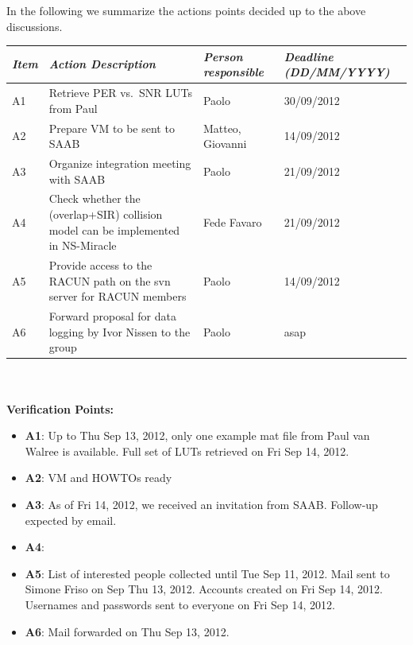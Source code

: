 \documentclass[11pt,journal,draftclsnofoot,onecolumn,twoside,letterpaper]{IEEEtran}
\theoremstyle{definition} \newtheorem{definition}[]{Definition}
\theoremstyle{theorem} \newtheorem{theorem}[]{Theorem}
\begin{document}
In the following we summarize the actions points decided up to the above discussions. 

\begin{tabular}{|p{}|p{}|p{}|p{}|}
\hline
{\it Item} & {\it Action Description} & {\it Person responsible} & {\it Deadline (DD/MM/YYYY)}\\
\hline
A1 &  Retrieve PER vs.~SNR LUTs from Paul & Paolo  & 30/09/2012 \\ 
A2 &  Prepare VM to be sent to SAAB & Matteo, Giovanni  &  14/09/2012\\
A3 &  Organize integration meeting with SAAB & Paolo & 21/09/2012 \\
A4 &  Check whether the (overlap+SIR) collision model can be implemented in NS-Miracle & Fede Favaro & 21/09/2012\\
A5 &  Provide access to the RACUN path on the svn server for RACUN members & Paolo & 14/09/2012\\ 
A6 &  Forward proposal for data logging by Ivor Nissen to the group & Paolo & asap \\
\hline
\end{tabular}
\ \\
\ \\
{\bf Verification Points:}
\begin{itemize}
  \item {\bf A1}: Up to Thu Sep 13, 2012, only one example mat file from Paul van Walree is available. Full set of LUTs retrieved on Fri Sep 14, 2012. 
  \item {\bf A2}: VM and HOWTOs ready
  \item {\bf A3}: As of Fri 14, 2012, we received an invitation from SAAB. Follow-up expected by email.
  \item {\bf A4}:
  \item {\bf A5}: List of interested people collected until Tue Sep 11, 2012. Mail sent to Simone Friso on Sep Thu 13, 2012. Accounts created on Fri Sep 14, 2012. Usernames and passwords sent to everyone on Fri Sep 14, 2012.
  \item {\bf A6}: Mail forwarded on Thu Sep 13, 2012.
\end{itemize}
\end{document}
